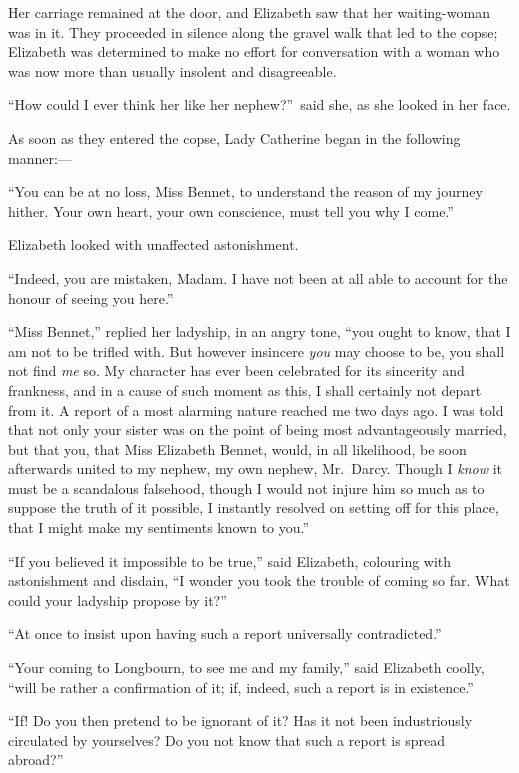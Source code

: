 \documentclass[12pt,english]{book}
\begin{document}
Her carriage remained at the door, and Elizabeth saw that her waiting-woman
was in it. They proceeded in silence along the gravel walk that led
to the copse; Elizabeth was determined to make no effort for conversation
with a woman who was now more than usually insolent and disagreeable.

{}``How could I ever think her like her nephew?''\ said she, as
she looked in her face.

As soon as they entered the copse, Lady Catherine began in the following
manner:\mbox{---}

{}``You can be at no loss, Miss Bennet, to understand the reason
of my journey hither. Your own heart, your own conscience, must tell
you why I come.''

Elizabeth looked with unaffected astonishment.

{}``Indeed, you are mistaken, Madam. I have not been at all able
to account for the honour of seeing you here.''

{}``Miss Bennet,'' replied her ladyship, in an angry tone, {}``you
ought to know, that I am not to be trifled with. But however insincere
\textit{you} may choose to be, you shall not find \textit{me} so.
My character has ever been celebrated for its sincerity and frankness,
and in a cause of such moment as this, I shall certainly not depart
from it. A report of a most alarming nature reached me two days ago.
I was told that not only your sister was on the point of being most
advantageously married, but that you, that Miss Elizabeth Bennet,
would, in all likelihood, be soon afterwards united to my nephew,
my own nephew, Mr.\ Darcy. Though I \textit{know} it must be a scandalous
falsehood, though I would not injure him so much as to suppose the
truth of it possible, I instantly resolved on setting off for this
place, that I might make my sentiments known to you.''

{}``If you believed it impossible to be true,'' said Elizabeth,
colouring with astonishment and disdain, {}``I wonder you took the
trouble of coming so far. What could your ladyship propose by it?''\ 

{}``At once to insist upon having such a report universally contradicted.''

{}``Your coming to Longbourn, to see me and my family,'' said Elizabeth
coolly, {}``will be rather a confirmation of it; if, indeed, such
a report is in existence.''

{}``If! Do you then pretend to be ignorant of it? Has it not been
industriously circulated by yourselves? Do you not know that such
a report is spread abroad?''\ 
\end{document}
